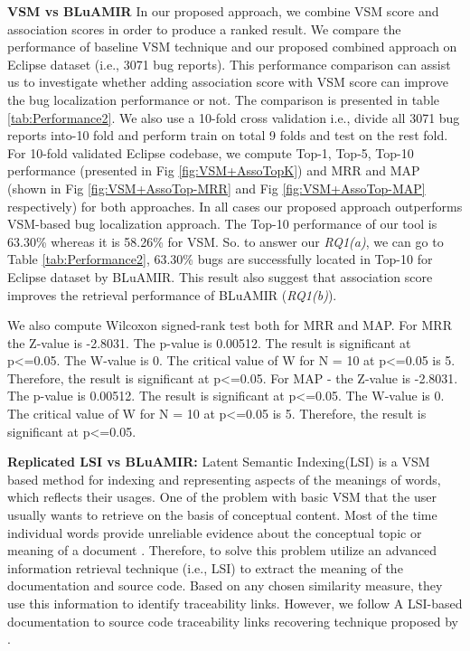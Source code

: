 \documentclass[conference]{IEEEtran}
\begin{document}
\textbf{VSM vs BLuAMIR}
In our proposed approach, we combine VSM score and association scores in order to produce a ranked result. We compare the performance of baseline VSM technique and our proposed combined approach on Eclipse dataset (i.e., 3071 bug reports). This performance comparison can assist us to investigate whether adding association score with VSM score can improve the bug localization performance or not. The comparison is presented in table \ref{tab:Performance2}. We also use a 10-fold cross validation i.e., divide all 3071 bug reports into-10 fold and perform train on total 9 folds and test on the rest fold. For 10-fold validated Eclipse codebase, we compute Top-1, Top-5, Top-10 performance (presented in Fig \ref{fig:VSM+AssoTopK}) and MRR and MAP (shown in Fig \ref{fig:VSM+AssoTop-MRR} and Fig \ref{fig:VSM+AssoTop-MAP} respectively) for both approaches. In all cases our proposed approach outperforms VSM-based bug localization approach. The Top-10 performance of our tool is 63.30\% whereas it is 58.26\% for VSM.
So. to answer our \textit{RQ1(a)}, we can go to Table \ref{tab:Performance2}, 63.30\% bugs are successfully located in Top-10 for Eclipse dataset by BLuAMIR. This result also suggest that association score improves the retrieval performance of BLuAMIR (\textit{RQ1(b)}). 


We also compute Wilcoxon signed-rank test both for MRR and MAP. For MRR the {Z}-value is -2.8031. The {p}-value is 0.00512. The result is significant at p<=0.05. The W-value is 0. The critical value of W for N = 10 at p<=0.05 is 5. Therefore, the result is significant at p<=0.05.
For MAP - the {Z}-value is -2.8031. The {p}-value is 0.00512. The result is significant at p<=0.05. The W-value is 0. The critical value of W for N = 10 at p<=0.05 is 5. Therefore, the result is significant at p<=0.05.


\textbf{Replicated LSI vs BLuAMIR:}
Latent Semantic Indexing(LSI) is a VSM based method for indexing and representing aspects of the meanings of words, which reflects their usages. One of the problem with basic VSM that the user usually wants to retrieve on the basis of conceptual content. Most of the time individual words provide unreliable evidence about the conceptual topic or meaning of a document \cite{LSIindexing}. Therefore, to solve this problem \cite{Maletic, MarcusMaletic} utilize an advanced information retrieval technique (i.e., LSI) to extract the meaning of the documentation and source code. Based on any chosen similarity measure, they use this information to identify traceability links. However, we follow A LSI-based documentation to source code traceability links recovering technique proposed by \citet{MarcusLSI}.
\end{document}
